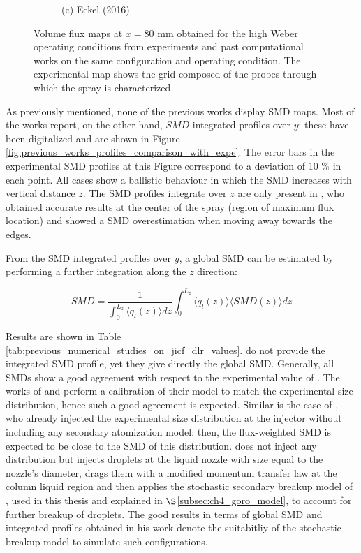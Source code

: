 \begin{figure}[h!]
\begin{subfigure}[b]{0.2\textwidth}
   \caption*{(c) Eckel (2016)}
\end{subfigure}
\caption{Volume flux maps at $x = 80$ mm obtained for the high Weber operating conditions from experiments  and past computational works on the same configuration and operating condition. The experimental map shows the grid composed of the probes through which the spray is characterized}
\label{fig:maps_previous_numerical_results}
\end{figure}

As previously mentioned, none of the previous works display SMD maps. Most of the works report, on the other hand, $SMD$ integrated profiles over $y$: these have been digitalized and are shown in Figure \ref{fig:previous_works_profiles_comparison_with_expe}.   The error bars in the experimental SMD profiles at this Figure correspond to a deviation of 10 $\%$ in each point. All cases show a ballistic behaviour in which the SMD increases with vertical distance $z$. The SMD profiles integrate over $z$ are only present in , who obtained accurate results at the center of the spray (region of maximum flux location) and showed a SMD overestimation when moving away towards the edges.

From the SMD integrated profiles over $y$, a global SMD can be estimated by performing a further integration along the $z$ direction:

\begin{equation}
 SMD =  \frac{1}{ \int_0^{L_z} \langle q_l \left( z \right) \rangle dz} \int_0^{L_z} \langle q_l \left( z \right) \rangle \langle SMD \left( z \right) \rangle dz
\end{equation}


Results are shown in Table \ref{tab:previous_numerical_studies_on_jicf_dlr_values}.   do not provide the integrated SMD profile, yet they give directly the global SMD. Generally, all SMDs show a good agreement with respect to the experimental value of . The works of  and  perform a calibration of their model to match the experimental size distribution, hence such a good agreement is expected. Similar is the case of , who already injected the experimental size distribution at the injector without including any secondary atomization model: then, the flux-weighted SMD is expected to be close to the SMD of this distribution.  does not inject any distribution but injects droplets at the liquid nozzle with size equal to the nozzle's diameter, drags them with a modified momentum transfer law at the column liquid region and then applies the stochastic secondary breakup model of , used in this thesis and explained in $\S$\ref{subsec:ch4_goro_model}, to account for further breakup of droplets. The good results in terms of global SMD and integrated profiles obtained in his work denote the suitabitliy of the stochastic breakup model to simulate such configurations.




